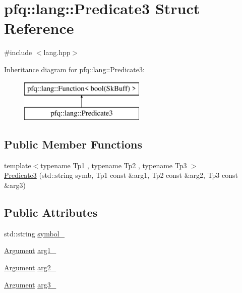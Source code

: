 \hypertarget{structpfq_1_1lang_1_1Predicate3}{\section{pfq\+:\+:lang\+:\+:Predicate3 Struct Reference}
\label{structpfq_1_1lang_1_1Predicate3}
}


{\ttfamily \#include $<$lang.\+hpp$>$}

Inheritance diagram for pfq\+:\+:lang\+:\+:Predicate3\+:\begin{figure}[H]
\begin{center}
\leavevmode
\includegraphics[height=2.000000cm]{structpfq_1_1lang_1_1Predicate3}
\end{center}
\end{figure}
\subsection*{Public Member Functions}
\begin{DoxyCompactItemize}
\item 
{\footnotesize template$<$typename Tp1 , typename Tp2 , typename Tp3 $>$ }\\\hyperlink{structpfq_1_1lang_1_1Predicate3_a2a09aae9cf46891a9703541635871d12}{Predicate3} (std\+::string symb, Tp1 const \&arg1, Tp2 const \&arg2, Tp3 const \&arg3)
\end{DoxyCompactItemize}
\subsection*{Public Attributes}
\begin{DoxyCompactItemize}
\item 
std\+::string \hyperlink{structpfq_1_1lang_1_1Predicate3_a52443a0d920e3f09428b667ae772806f}{symbol\+\_\+}
\item 
\hyperlink{structpfq_1_1lang_1_1Argument}{Argument} \hyperlink{structpfq_1_1lang_1_1Predicate3_a2dbec6ae0a1a9a0d7d96f3802c7bc105}{arg1\+\_\+}
\item 
\hyperlink{structpfq_1_1lang_1_1Argument}{Argument} \hyperlink{structpfq_1_1lang_1_1Predicate3_aa468c48d544055e2f2ee140b6e42f430}{arg2\+\_\+}
\item 
\hyperlink{structpfq_1_1lang_1_1Argument}{Argument} \hyperlink{structpfq_1_1lang_1_1Predicate3_abfb8ea25114fbaeef11277e930ebab22}{arg3\+\_\+}
\end{DoxyCompactItemize}
